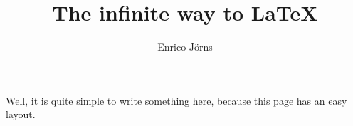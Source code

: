 \documentclass[a4paper,portrait]{scrreprt}
\makeatletter
\renewcommand{\maketitle}{%
\setlength{\fboxsep}{0cm}%
\hspace*{-\tubspage@borderwidth}%
\ifthenelse{\boolean{tubspage@marginleft}}{%
  \hspace*{-\marginparwidth}%
  \hspace*{-\marginparsep}%
}{}%
\raisebox{\tubspage@borderwidth}[0cm]{%
\colorbox{tuSecondaryLight}{%
  \begin{minipage}[t][\textheight+2\tubspage@borderwidth]{%
    \paperwidth-2\tubspage@borderwidth}%
      \LARGE asdf dfg sdfg dsfg dsf
  \end{minipage}%
}}%
\vspace*{-0.75\tubslogoHeight}\vspace{-\textheight}\vspace*{-2\tubspage@borderwidth}\\%
\hspace*{-2\tubspage@borderwidth}%
\ifthenelse{\boolean{tubspage@marginleft}}{%
  \hspace*{-\marginparwidth}%
  \hspace*{-\marginparsep}%
}{}%
\colorbox{tuRed}{%
\hbox to \tubslogoWidth{\vbox to \tubslogoHeight{\tubslogo}}%
}\vspace*{-0.25\tubslogoHeight}%
}
\newcommand\BackgroundPic{%
\put(\LenToUnit{\tubspage@borderwidth},\LenToUnit{\tubspage@borderwidth}){%
\colorbox{tuGreenLight40}{\parbox[b][\paperheight-\tubspage@senderheight-\tubspage@borderwidth]{%
  \paperwidth-2\tubspage@borderwidth}{%
~
}}}}
\makeatother
\begin{document}


\author{Enrico Jörns}
\title{The infinite way to LaTeX}

Well, it is quite simple to write something here, because this page has an easy
layout.

~
\newpage

\begin{tubsbox}[tuBlue100]{0}{1}{6}{1}
~
\end{tubsbox}
\begin{tubsbox}[tuBlue80]{0}{2}{6}{1}
~
\end{tubsbox}
\begin{tubsbox}[tuBlue60]{0}{3}{6}{1}
~
\end{tubsbox}
\begin{tubsbox}[tuBlue40]{0}{4}{6}{1}
~
\end{tubsbox}
\begin{tubsbox}[tuGreen60]{0}{5}{6}{1}
~
\end{tubsbox}
\begin{tubsbox}[tuGreen40]{0}{6}{6}{1}
~
\end{tubsbox}
\begin{tubsbox}[tuGreen20]{0}{7}{6}{1}
~
\end{tubsbox}
\begin{tubsbox}[tuRed]{0}{8}{6}{1}
~
\end{tubsbox}
~
\newpage



\end{document}
